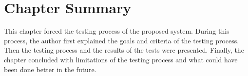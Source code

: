 \section{Chapter Summary}

This chapter forced the testing process of the proposed system. During this process, the author first explained the goals and criteria of the testing process. Then the testing process and the results of the tests were presented. Finally, the chapter concluded with limitations of the testing process and what could have been done better in the future.